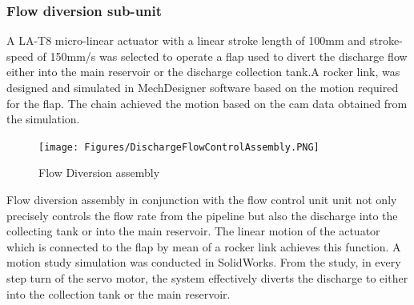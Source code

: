 \subsubsection{Flow diversion sub-unit}
A LA-T8 micro-linear actuator with a linear stroke length of 100mm and stroke-speed of 150mm/s was selected to operate a flap used to divert the discharge flow either into the main reservoir or the discharge collection tank.A rocker link, was designed and simulated in MechDesigner software based on the motion required for the flap. The chain achieved the motion based on the cam data obtained from the simulation.
\begin{figure}[H]
         \centering
         \texttt{[image: Figures/DischargeFlowControlAssembly.PNG]}
         \caption{Flow Diversion assembly}
         \label{fig:flow_diversion_assembly}
     \end{figure}
\par
Flow diversion assembly in conjunction with the flow control unit unit not only precisely controls the flow rate from the pipeline but also the discharge into the collecting tank or into the main reservoir. The linear motion of the actuator which is connected to the flap by mean of a rocker link achieves this function. A motion study simulation was conducted in SolidWorks. From  the study, in every step turn of the servo motor, the system effectively diverts the discharge to either into the collection tank or the main reservoir. 
